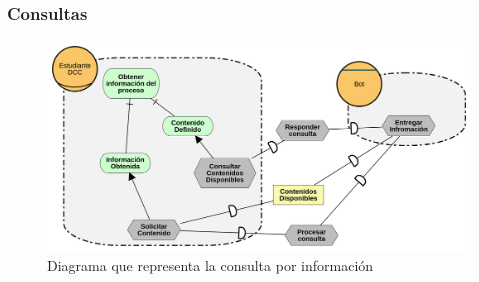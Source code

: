     \subsubsection{Consultas}
        \begin{figure}[ht]
            \centering
            \includegraphics[width=\textwidth]{media/diagramas/i_star/Consultas.png}
            \caption[Diagrama i* Consultas]{Diagrama que representa la consulta por información}
            \label{}
        \end{figure}


